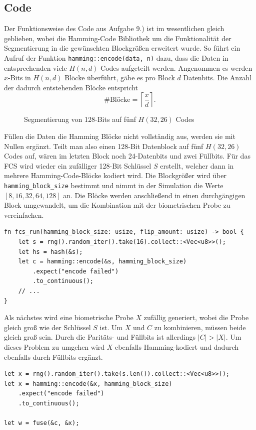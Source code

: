 \documentclass{article}
\begin{document}
    \subsection{Code}
    Der Funktionsweise des Code aus Aufgabe 9.) ist im wesentlichen gleich geblieben, wobei die Hamming-Code Bibliothek um die 
    Funktionalität der Segmentierung in die gewünschten Blockgrößen erweitert wurde. So führt ein Aufruf
    der Funktion \verb|hamming::encode(data, n)| dazu, dass die Daten in entsprechenden viele $H(n,d)$ Codes
    aufgeteilt werden. Angenommen es werden $x$-Bits in $H(n,d)$ Blöcke überführt, gäbe es pro Block $d$ Datenbits.
    Die Anzahl der dadurch entstehenden Blöcke entspricht
    \begin{equation} \label{eq:1}
        \#\text{Blöcke}=\left\lceil\frac{x}{d}\right\rceil.
    \end{equation}
    \begin{figure}[h]
        \caption{Segmentierung von 128-Bits auf fünf $H(32,26)$ Codes}
        \label{fig:segmentation}
    \end{figure}
    Füllen die Daten die Hamming Blöcke nicht vollständig aus, werden sie mit Nullen ergänzt. Teilt man also einen
    128-Bit Datenblock auf fünf $H(32,26)$ Codes auf, wären im letzten Block noch 24-Datenbits und zwei Füllbits.
    Für das FCS wird wieder ein zufälliger 128-Bit Schlüssel $S$ erstellt, welcher dann in mehrere Hamming-Code-Blöcke kodiert wird.
    Die Blockgrößer wird über \verb|hamming_block_size| bestimmt und nimmt in der Simulation die Werte $\left[8,16,32,64,128\right]$
    an. Die Blöcke werden anschließend in einen durchgängigen Block umgewandelt, um die Kombination mit der biometrischen Probe
    zu vereinfachen.
    \begin{verbatim}
fn fcs_run(hamming_block_size: usize, flip_amount: usize) -> bool {
    let s = rng().random_iter().take(16).collect::<Vec<u8>>();
    let hs = hash(&s);
    let c = hamming::encode(&s, hamming_block_size)
        .expect("encode failed")
        .to_continuous();
    // ...
}
    \end{verbatim}
    Als nächstes wird eine biometrische Probe $X$ zufällig generiert, wobei die Probe gleich groß wie der Schlüssel $S$ ist.
    Um $X$ und $C$ zu kombinieren, müssen beide gleich groß sein. Durch die Paritäts- und Füllbits ist allerdings $|C|>|X|$.
    Um dieses Problem zu umgehen wird $X$ ebenfalls Hamming-kodiert und dadurch ebenfalls durch Füllbits ergänzt.
    \begin{verbatim}
let x = rng().random_iter().take(s.len()).collect::<Vec<u8>>();
let x = hamming::encode(&x, hamming_block_size)
    .expect("encode failed")
    .to_continuous();

let w = fuse(&c, &x);
    \end{verbatim}
\end{document}
